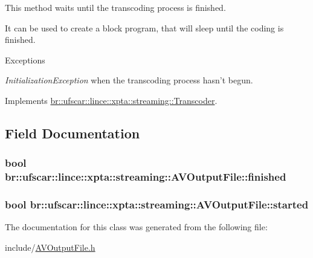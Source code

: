 This method waits until the transcoding process is finished. 

It can be used to create a block program, that will sleep until the coding is finished. 
\begin{DoxyExceptions}{Exceptions}
\item[{\em InitializationException}]when the transcoding process hasn't begun. \end{DoxyExceptions}


Implements \hyperlink{classbr_1_1ufscar_1_1lince_1_1xpta_1_1streaming_1_1Transcoder_ac060d2266b2b4b41b1f62eb0c6a48be3}{br::ufscar::lince::xpta::streaming::Transcoder}.



\subsection{Field Documentation}
\hypertarget{classbr_1_1ufscar_1_1lince_1_1xpta_1_1streaming_1_1AVOutputFile_a518fd941f5d441f01be59e506e203d34}{
\subsubsection[{finished}]{\setlength{\rightskip}{0pt plus 5cm}bool {\bf br::ufscar::lince::xpta::streaming::AVOutputFile::finished}}}
\label{classbr_1_1ufscar_1_1lince_1_1xpta_1_1streaming_1_1AVOutputFile_a518fd941f5d441f01be59e506e203d34}
\hypertarget{classbr_1_1ufscar_1_1lince_1_1xpta_1_1streaming_1_1AVOutputFile_aab4b600fb20a80bb2045729a2423027f}{
\subsubsection[{started}]{\setlength{\rightskip}{0pt plus 5cm}bool {\bf br::ufscar::lince::xpta::streaming::AVOutputFile::started}}}
\label{classbr_1_1ufscar_1_1lince_1_1xpta_1_1streaming_1_1AVOutputFile_aab4b600fb20a80bb2045729a2423027f}


The documentation for this class was generated from the following file:\begin{DoxyCompactItemize}
\item 
include/\hyperlink{AVOutputFile_8h}{AVOutputFile.h}\end{DoxyCompactItemize}
